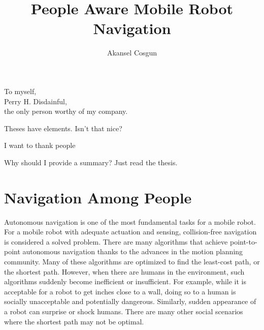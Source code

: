 \documentclass[12pt]{gatech-thesis}
\title{People Aware Mobile Robot Navigation} %
\author{Akansel Cosgun}
\begin{document}
%

\begin{preliminary}
\begin{dedication}
\null\vfil
{\large
\begin{center}
To myself,\\\vspace{12pt}
Perry H. Disdainful,\\\vspace{12pt}
the only person worthy of my company.
\end{center}}
\vfil\null
\end{dedication}
\begin{preface}
Theses have elements.  Isn't that nice?
\end{preface}
\begin{acknowledgements}
I want to thank people
\end{acknowledgements}
\contents
\begin{summary}
Why should I provide a summary?  Just read the thesis.
\end{summary}
\end{preliminary}






\chapter{Navigation Among People}
\label{chapter:navigation_among_people}

Autonomous navigation is one of the most fundamental tasks for a mobile robot. For a mobile robot with adequate actuation and sensing, collision-free navigation is considered a solved problem. There are many algorithms that achieve point-to-point autonomous navigation thanks to the advances in the motion planning community. Many of these algorithms are optimized to find the least-cost path, or the shortest path. However, when there are humans in the environment, such algorithms suddenly become inefficient or insufficient. For example, while it is acceptable for a robot to get inches close to a wall, doing so to a human is socially unacceptable and potentially dangerous. Similarly, sudden appearance of a robot can surprise or shock humans. There are many other social scenarios where the shortest path may not be optimal. 
\end{document}
